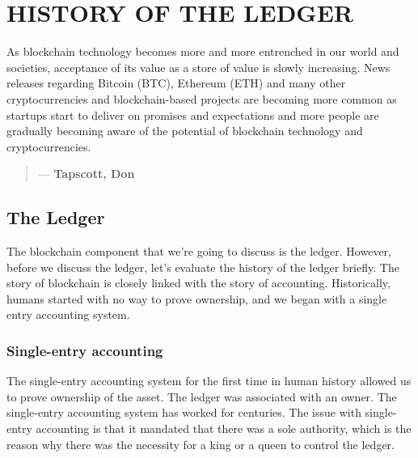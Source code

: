 \chapter{HISTORY OF THE LEDGER}
\label{ch:Ledger}

As blockchain technology becomes more and more entrenched in our world and societies, acceptance of its value as a store of value is slowly increasing. News releases regarding Bitcoin (BTC), Ethereum (ETH) and many other cryptocurrencies and blockchain-based projects are becoming more common as startups start to deliver on promises and expectations and more people are gradually becoming aware of the potential of blockchain technology and cryptocurrencies.

\begin{quotation}

      \textit{}
      \begin{flushright}
        \small{--- \textbf{Tapscott, Don}}
      \end{flushright}
    
\end{quotation}

 \section{The Ledger}
The blockchain component that we're going to discuss is the ledger. However, before we discuss the ledger, let's evaluate the history of the ledger briefly. The story of blockchain is closely linked with the story of accounting. Historically, humans started with no way to prove ownership, and we began with a single entry accounting system.

\subsection{Single-entry accounting}
The single-entry accounting system for the first time in human history allowed us to prove ownership of the asset. The ledger was associated with an owner. The single-entry accounting system has worked for centuries. The issue with single-entry accounting is that it mandated that there was a sole authority, which is the reason why there was the necessity for a king or a queen to control the ledger.\medskip

